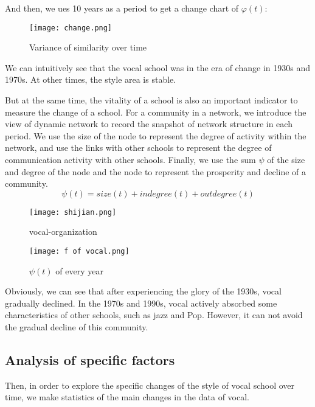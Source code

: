 \documentclass[12pt]{article}  %
\begin{document}
And then, we ues 10 years as a period to get a change chart of $\varphi (t)$:

\begin{figure}[H]
	\centering
	\texttt{[image: change.png]}
	\caption{Variance of similarity over time}
	\label{img}
\end{figure}

We can intuitively see that the vocal school was in the era of change in 1930s and 1970s. At other times, the style area is stable.

But at the same time, the vitality of a school is also an important indicator to measure the change of a school. For a community in a network, we introduce the view of dynamic network to record the snapshot of network structure in each period. We use the size of the node to represent the degree of activity within the network, and use the links with other schools to represent the degree of communication activity with other schools. Finally, we use the sum $\psi $ of the size and degree of the node and  the node to represent the prosperity and decline of a community.
\begin{equation}
\psi (t)=size(t)+indegree(t)+outdegree(t)
\end{equation}
\begin{figure}[htbp]
	\centering
	\begin{minipage}[t]{0.48\textwidth}
		\centering
		\texttt{[image: shijian.png]}
		\caption{vocal-organization}
	\end{minipage}
	\begin{minipage}[t]{0.48\textwidth}
		\centering
		\texttt{[image: f of vocal.png]}
		\caption{$\psi(t)$ of every year}
	\end{minipage}
\end{figure}


Obviously, we can see that after experiencing the glory of the 1930s, vocal gradually declined. In the 1970s and 1990s, vocal actively absorbed some characteristics of other schools, such as jazz and Pop. However, it can not avoid the gradual decline of this community.

\subsection{Analysis of specific factors}

Then, in order to explore the specific changes of the style of vocal school over time, we make statistics of the main changes in the data of vocal.
\end{document}
